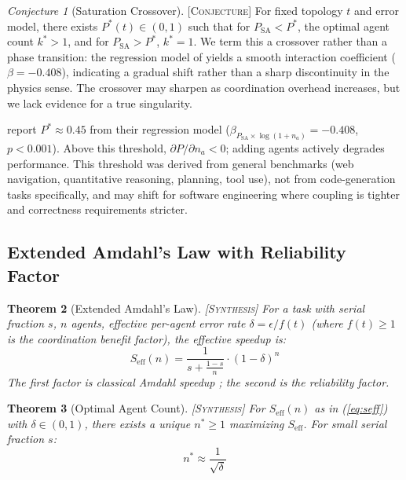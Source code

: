 \documentclass[11pt]{article}
\newtheorem{theorem}{Theorem}[section]
\theoremstyle{definition}
\theoremstyle{remark}
\newtheorem{conjecture}[theorem]{Conjecture}
\newcommand{\synthesis}{\textsc{[Synthesis]}}
\newcommand{\conjectured}{\textsc{[Conjecture]}}
\begin{document}
\begin{conjecture}[Saturation Crossover] \conjectured{}
\label{conj:phase}
For fixed topology $t$ and error model, there exists $P^*(t) \in (0,1)$ such that for $P_{\mathrm{SA}} < P^*$, the optimal agent count $k^* > 1$, and for $P_{\mathrm{SA}} > P^*$, $k^* = 1$.
We term this a crossover rather than a phase transition: the regression model of \citet{Kim2025} yields a smooth interaction coefficient ($\beta = -0.408$), indicating a gradual shift rather than a sharp discontinuity in the physics sense. The crossover may sharpen as coordination overhead increases, but we lack evidence for a true singularity.
\end{conjecture}

\citet{Kim2025} report $P^* \approx 0.45$ from their regression model ($\beta_{P_{\mathrm{SA}} \times \log(1+n_a)} = -0.408$, $p < 0.001$).
Above this threshold, $\partial P / \partial n_a < 0$; adding agents actively degrades performance.
This threshold was derived from general benchmarks (web navigation, quantitative reasoning, planning, tool use), not from code-generation tasks specifically, and may shift for software engineering where coupling is tighter and correctness requirements stricter.

\subsection{Extended Amdahl's Law with Reliability Factor}

\begin{theorem}[Extended Amdahl's Law] \synthesis{}
\label{thm:amdahl}
For a task with serial fraction $s$, $n$ agents, effective per-agent error rate $\delta = \epsilon / f(t)$ (where $f(t) \geq 1$ is the coordination benefit factor), the effective speedup is:
\begin{equation}
\label{eq:seff}
  S_{\mathrm{eff}}(n) = \frac{1}{s + \frac{1-s}{n}} \cdot (1 - \delta)^n
\end{equation}
The first factor is classical Amdahl speedup \citep{Amdahl1967}; the second is the reliability factor.
\end{theorem}

\begin{theorem}[Optimal Agent Count] \synthesis{}
\label{thm:nstar}
For $S_{\mathrm{eff}}(n)$ as in (\ref{eq:seff}) with $\delta \in (0,1)$, there exists a unique $n^* \geq 1$ maximizing $S_{\mathrm{eff}}$.
For small serial fraction $s$:
\begin{equation}
\label{eq:nstar}
  n^* \approx \frac{1}{\sqrt{\delta}}
\end{equation}
\end{theorem}
\end{document}
